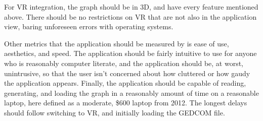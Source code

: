 \documentclass[onecolumn, draftclsnofoot,10pt, compsoc]{IEEEtran}
\begin{document}
For VR integration, the graph should be in 3D, and have every feature mentioned above. There should be no restrictions on VR that are not also in the application view, baring unforeseen errors with operating systems.

Other metrics that the application should be measured by is ease of use, aesthetics, and speed. The application should be fairly intuitive to use for anyone who is reasonably computer literate, and the application should be, at worst, unintrusive, so that the user isn’t concerned about how cluttered or how gaudy the application appears. Finally, the application should be  capable of reading, generating, and loading the graph in a reasonably amount of time on a reasonable laptop, here defined as a moderate, \$600 laptop from 2012. The longest delays should follow switching to VR, and initially loading the GEDCOM file. 
\end{document}
